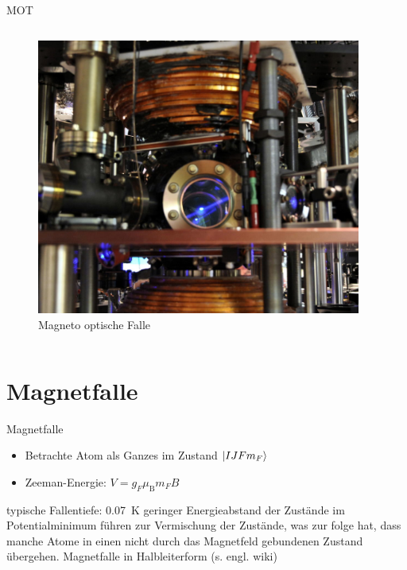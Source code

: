 \documentclass[12pt]{beamer}
\begin{document}
\begin{frame}{MOT}
\begin{columns}

	\begin{figure}
		\centering
		\includegraphics[width=0.95\textwidth]{./figures/mot_columbia.jpg}
		\caption{Magneto optische Falle \cite{columbia}}
	\end{figure}
\end{columns}
\end{frame}


\section{Magnetfalle}

\begin{frame}{Magnetfalle}

\begin{itemize}
	\item Betrachte Atom als Ganzes im Zustand $\ket{I J F m_F}$
	\item Zeeman-Energie: $V = g_F \mu_\mathrm{B} m_F B$
\end{itemize}

typische Fallentiefe: \SI{0.07}{\kelvin}
geringer Energieabstand der Zustände im Potentialminimum führen zur Vermischung der Zustände, was zur folge hat, dass manche Atome in einen nicht durch das Magnetfeld gebundenen Zustand übergehen.
Magnetfalle in Halbleiterform (s. engl. wiki)
\end{frame}
\end{document}
